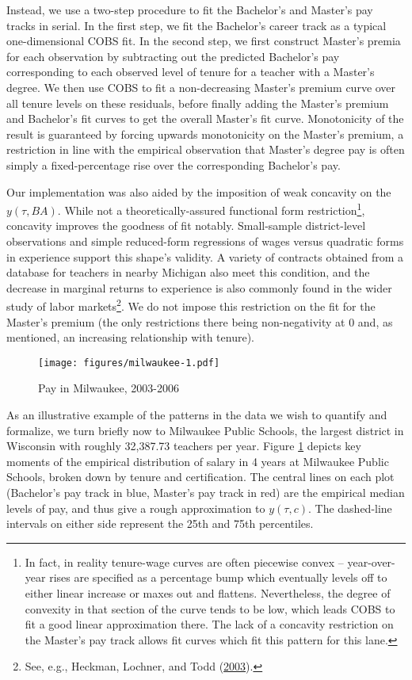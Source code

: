 \documentclass[12pt,]{article}
\let\rmarkdownfootnote\footnote%
\def\footnote{\protect\rmarkdownfootnote}
\begin{document}
Instead, we use a two-step procedure to fit the Bachelor's and Master's
pay tracks in serial. In the first step, we fit the Bachelor's career
track as a typical one-dimensional COBS fit. In the second step, we
first construct Master's premia for each observation by subtracting out
the predicted Bachelor's pay corresponding to each observed level of
tenure for a teacher with a Master's degree. We then use COBS to fit a
non-decreasing Master's premium curve over all tenure levels on these
residuals, before finally adding the Master's premium and Bachelor's fit
curves to get the overall Master's fit curve. Monotonicity of the result
is guaranteed by forcing upwards monotonicity on the Master's premium, a
restriction in line with the empirical observation that Master's degree
pay is often simply a fixed-percentage rise over the corresponding
Bachelor's pay.

Our implementation was also aided by the imposition of weak concavity on
the \(y(\tau, BA)\). While not a theoretically-assured functional form
restriction\footnote{In fact, in reality tenure-wage curves are often
  piecewise convex -- year-over-year rises are specified as a percentage
  bump which eventually levels off to either linear increase or maxes
  out and flattens. Nevertheless, the degree of convexity in that
  section of the curve tends to be low, which leads COBS to fit a good
  linear approximation there. The lack of a concavity restriction on the
  Master's pay track allows fit curves which fit this pattern for this
  lane.}, concavity improves the goodness of fit notably. Small-sample
district-level observations and simple reduced-form regressions of wages
versus quadratic forms in experience support this shape's validity. A
variety of contracts obtained from a database for teachers in nearby
Michigan also meet this condition, and the decrease in marginal returns
to experience is also commonly found in the wider study of labor
markets\footnote{See, e.g., Heckman, Lochner, and Todd
  (\protect\hyperlink{ref-heckman}{2003}).}. We do not impose this
restriction on the fit for the Master's premium (the only restrictions
there being non-negativity at 0 and, as mentioned, an increasing
relationship with tenure).

\begin{figure}[htbp]
\centering
\texttt{[image: figures/milwaukee-1.pdf]}
\caption{\label{fig:mwk}Pay in Milwaukee, 2003-2006}
\end{figure}

As an illustrative example of the patterns in the data we wish to
quantify and formalize, we turn briefly now to Milwaukee Public Schools,
the largest district in Wisconsin with roughly 32,387.73 teachers per
year. Figure \ref{fig:mwk} depicts key moments of the empirical
distribution of salary in 4 years at Milwaukee Public Schools, broken
down by tenure and certification. The central lines on each plot
(Bachelor's pay track in blue, Master's pay track in red) are the
empirical median levels of pay, and thus give a rough approximation to
\(y(\tau, c)\). The dashed-line intervals on either side represent the
25th and 75th percentiles.
\end{document}
